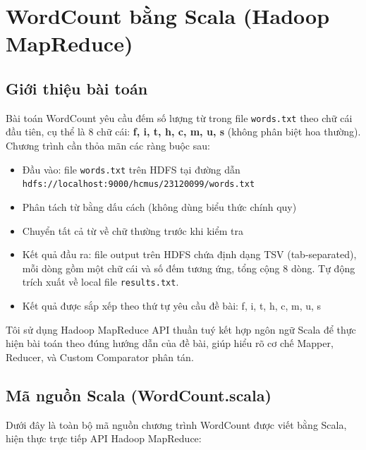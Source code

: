 \section{WordCount bằng Scala (Hadoop MapReduce)}

\subsection{Giới thiệu bài toán}

Bài toán WordCount yêu cầu đếm số lượng từ trong file \texttt{words.txt} theo chữ
cái đầu tiên, cụ thể là 8 chữ cái: \textbf{f, i, t, h, c, m, u, s} (không phân
biệt hoa thường). Chương trình cần thỏa mãn các ràng buộc sau:

\begin{itemize}
  \item Đầu vào: file \texttt{words.txt} trên HDFS tại đường dẫn
        \texttt{hdfs://localhost:9000/hcmus/23120099/words.txt}
  \item Phân tách từ bằng dấu cách (không dùng biểu thức chính quy)
  \item Chuyển tất cả từ về chữ thường trước khi kiểm tra
  \item Kết quả đầu ra: file output trên HDFS chứa định dạng TSV (tab-separated),
        mỗi dòng gồm một chữ cái và số đếm tương ứng, tổng cộng 8 dòng. Tự động trích
        xuất về local file \texttt{results.txt}.
  \item Kết quả được sắp xếp theo thứ tự yêu cầu đề bài: f, i, t, h, c, m, u, s
\end{itemize}

Tôi sử dụng Hadoop MapReduce API thuần tuý kết hợp ngôn ngữ Scala để thực hiện bài toán 
theo đúng hướng dẫn của đề bài, giúp hiểu rõ cơ chế Mapper, Reducer, và Custom Comparator
phân tán.

\subsection{Mã nguồn Scala (WordCount.scala)}

Dưới đây là toàn bộ mã nguồn chương trình WordCount được viết bằng Scala, hiện thực
trực tiếp API Hadoop MapReduce:

